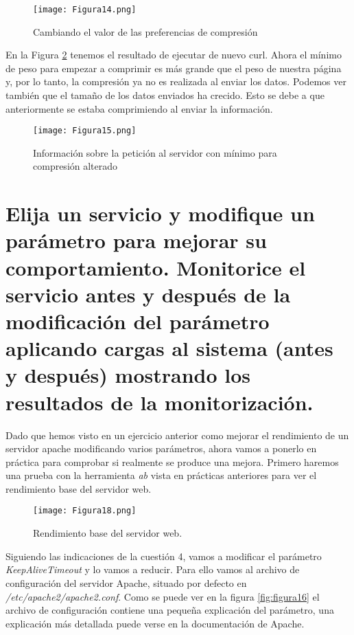 \begin{figure}[H] 
\centering
\texttt{[image: Figura14.png]}  
\caption{Cambiando el valor de las preferencias de compresión}\label{fig:figura14}
\end{figure}

En la Figura \ref{fig:figura15} tenemos el resultado de ejecutar de nuevo curl. Ahora el mínimo de peso para empezar a comprimir es más grande
que el peso de nuestra página y, por lo tanto, la compresión ya no es realizada al enviar los datos. Podemos ver también que el tamaño de los 
datos enviados ha crecido. Esto se debe a que anteriormente se estaba comprimiendo al enviar la información.

\begin{figure}[H] 
\centering
\texttt{[image: Figura15.png]}  
\caption{Información sobre la petición al servidor con mínimo para compresión alterado}\label{fig:figura15}
\end{figure}


\vspace{5mm}


\section{Elija un servicio y modifique un parámetro para mejorar su comportamiento. Monitorice el servicio antes y después de la modificación del parámetro aplicando cargas al sistema (antes y después) mostrando los resultados de la monitorización.}

Dado que hemos visto en un ejercicio anterior como mejorar el rendimiento de un servidor apache modificando varios parámetros, 
ahora vamos a ponerlo en práctica para comprobar si realmente se produce una mejora. Primero haremos una prueba con la 
herramienta \textit{ab}\cite{manab} vista en prácticas anteriores para ver el rendimiento base del servidor web.
 
\begin{figure}[H] 
\centering
\texttt{[image: Figura18.png]}  
\caption{Rendimiento base del servidor web.}\label{fig:figura18}
\end{figure}

Siguiendo las indicaciones de la cuestión 4, vamos a modificar el parámetro \textit{KeepAliveTimeout} y lo vamos a reducir. Para
ello vamos al archivo de configuración del servidor Apache, situado por defecto en \textit{/etc/apache2/apache2.conf}. Como se
puede ver en la figura \ref{fig:figura16} el archivo de configuración contiene una pequeña explicación del parámetro, una 
explicación más detallada puede verse en la documentación de Apache\cite{apacheargs}.  

